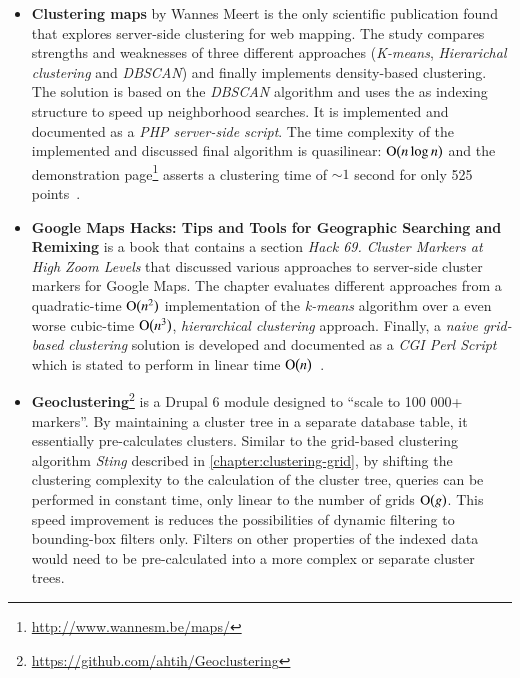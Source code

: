 \begin{itemize}

\item \textbf{Clustering maps} by Wannes Meert is the only scientific publication found that explores server-side clustering for web mapping. The study compares strengths and weaknesses of three different approaches (\textit{K-means}, \textit{Hierarichal clustering} and \textit{DBSCAN}) and finally implements density-based clustering. The solution is based on the \textit{DBSCAN} algorithm and uses the  as indexing structure to speed up neighborhood searches. It is implemented and documented as a \textit{PHP server-side script}. The time complexity of the implemented and discussed final algorithm is quasilinear: $\operatorname{O}\bigl(n \log{n}\bigr)$ and the demonstration page\footnote{\url{http://www.wannesm.be/maps/}} asserts a clustering time of $\sim 1$ second for only 525 points~\cite{Meert06clustermaps}.

\item \textbf{Google Maps Hacks: Tips and Tools for Geographic Searching and Remixing} is a book that contains a section \textit{Hack 69. Cluster Markers at High Zoom Levels} that discussed various approaches to server-side cluster markers for Google Maps. The chapter evaluates different approaches from a quadratic-time $\operatorname{O}\bigl(n^2\bigr)$ implementation of the \textit{k-means} algorithm over a even worse cubic-time $\operatorname{O}\bigl(n^3\bigr)$, \textit{hierarchical clustering} approach. Finally, a \textit{naive grid-based clustering} solution is developed and documented as a \textit{CGI Perl Script} which is stated to perform in linear time $\operatorname{O}\bigl(n\bigr)$~\cite{Gibson06Gmapshacks}.

\item \textbf{Geoclustering}\footnote{\url{https://github.com/ahtih/Geoclustering}} is a Drupal 6 module designed to ``scale to 100 000+ markers''. By maintaining a cluster tree in a separate database table, it essentially pre-calculates clusters. Similar to the grid-based clustering algorithm \textit{Sting} described in \ref{chapter:clustering-grid}, by shifting the clustering complexity to the calculation of the cluster tree, queries can be performed in constant time, only linear to the number of grids $\operatorname{O}\bigl(g\bigr)$. This speed improvement is reduces the possibilities of dynamic filtering to bounding-box filters only. Filters on other properties of the indexed data would need to be pre-calculated into a more complex or separate cluster trees. 

\end{itemize}



